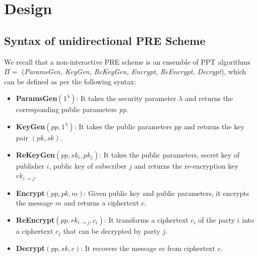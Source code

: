 \section{Design} \label{sec:design}

\subsection{Syntax of unidirectional PRE Scheme}
We recall that a non-interactive PRE scheme is an ensemble of PPT algorithms $\Pi = $ (\emph{ParamsGen, KeyGen, ReKeyGen, Encrypt, ReEncrypt, Decrypt}), which can be defined as per the following syntax:

\begin{itemize}
\item{\textbf{ParamsGen$\left( 1^\lambda\right)$}}: It takes the security parameter $\lambda$ and returns the corresponding public parameters \textit{pp}.

\item{\textbf{KeyGen$\left( pp, 1^\lambda\right)$}}: It takes the public parameters $pp$ and returns the key pair $\left(pk,sk \right)$.

\item{\textbf{ReKeyGen}$\left(pp, sk_i,pk_j \right)$}: It takes the public parameters, secret key of publisher $i$, public key of subscriber $j$ and returns the re-encryption key $rk_{i \rightarrow j}$.

\item{\textbf{Encrypt$\left(pp,pk,m \right)$}}: Given public key and public parameters, it encrypts the message $m$ and returns a ciphertext $c$.

\item{\textbf{ReEncrypt}$\left( pp, rk_{i\rightarrow j},c_i \right)$}: It transforms a ciphertext $c_i$ of the party $i$ into a ciphertext $c_j$ that can be decrypted by party $j$.

\item{\textbf{Decrypt}$\left(pp,sk,c\right)$}: It recovers the message $m$ from ciphertext $c$.

\end{itemize}